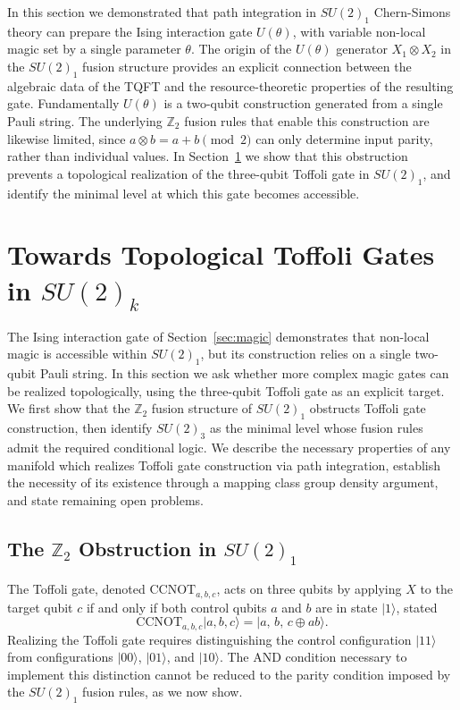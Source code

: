 \documentclass[12pt,a4paper]{article}
\def\ket#1{{|{#1}\rangle}}
\begin{document}
In this section we demonstrated that path integration in $SU(2)_1$ Chern-Simons theory can prepare the Ising interaction gate $U(\theta)$, with variable non-local magic set by a single parameter $\theta$. The origin of the $U(\theta)$ generator $X_1 \otimes X_2$ in the $SU(2)_1$ fusion structure provides an explicit connection between the algebraic data of the TQFT and the resource-theoretic properties of the resulting gate. Fundamentally $U(\theta)$ is a two-qubit construction generated from a single Pauli string. The underlying $\mathbb{Z}_2$ fusion rules that enable this construction are likewise limited, since $a \otimes b = a + b \pmod{2}$ can only determine input parity, rather than individual values. In Section~\ref{sec:su2k} we show that this obstruction prevents a topological realization of the three-qubit Toffoli gate in $SU(2)_1$, and identify the minimal level at which this gate becomes accessible.

 
\section{Towards Topological Toffoli Gates in $SU(2)_k$}\label{sec:su2k}

The Ising interaction gate of Section~\ref{sec:magic} demonstrates that non-local magic is accessible within $SU(2)_1$, but its construction relies on a single two-qubit Pauli string. In this section we ask whether more complex magic gates can be realized topologically, using the three-qubit Toffoli gate as an explicit target. We first show that the $\mathbb{Z}_2$ fusion structure of $SU(2)_1$ obstructs Toffoli gate construction, then identify $SU(2)_3$ as the minimal level whose fusion rules admit the required conditional logic. We describe the necessary properties of any manifold which realizes Toffoli gate construction via path integration, establish the necessity of its existence through a mapping class group density argument, and state remaining open problems.

\subsection{The $\mathbb{Z}_2$ Obstruction in $SU(2)_1$}\label{subsec:obstruction}

The Toffoli gate, denoted $\mathrm{CCNOT}_{a,b,c}$, acts on three qubits by applying $X$ to the target qubit $c$ if and only if both control qubits $a$ and $b$ are in state $\ket{1}$, stated
%
\begin{equation}\label{ToffoliAction}
\mathrm{CCNOT}_{a,b,c}\ket{a, b, c} = \ket{a,\, b,\, c \oplus ab}.
\end{equation}
%
Realizing the Toffoli gate requires distinguishing the control configuration $\ket{11}$ from configurations $\ket{00}$, $\ket{01}$, and $\ket{10}$. The AND condition necessary to implement this distinction cannot be reduced to the parity condition imposed by the $SU(2)_1$ fusion rules, as we now show.
\end{document}
